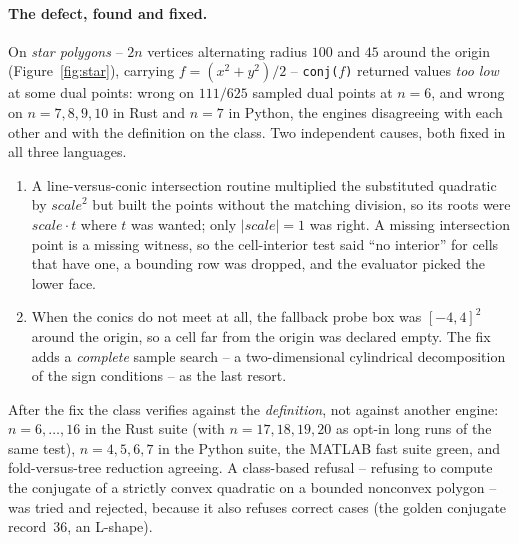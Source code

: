 \documentclass[11pt]{article}
\theoremstyle{definition}
\begin{document}
\paragraph{The defect, found and fixed.}
On \emph{star polygons} -- $2n$ vertices alternating radius $100$ and $45$
around the origin (Figure~\ref{fig:star}), carrying $f=(x^2+y^2)/2$ --
\texttt{conj($f$)} returned values \emph{too low} at some dual points: wrong on
$111/625$ sampled dual points at $n=6$, and wrong on $n=7,8,9,10$ in Rust and
$n=7$ in Python, the engines disagreeing with each other and with the
definition on the class. Two independent causes, both fixed in all three
languages.
\begin{enumerate}[label=(\arabic*),leftmargin=*]
\item A line-versus-conic intersection routine multiplied the substituted
  quadratic by $\mathit{scale}^2$ but built the points without the matching
  division, so its roots were $\mathit{scale}\cdot t$ where $t$ was wanted; only
  $|\mathit{scale}|=1$ was right. A missing intersection point is a missing
  witness, so the cell-interior test said ``no interior'' for cells that have
  one, a bounding row was dropped, and the evaluator picked the lower face.
\item When the conics do not meet at all, the fallback probe box was
  $[-4,4]^2$ around the origin, so a cell far from the origin was declared
  empty. The fix adds a \emph{complete} sample search -- a two-dimensional
  cylindrical decomposition of the sign conditions -- as the last resort.
\end{enumerate}
After the fix the class verifies against the \emph{definition}, not against
another engine: $n=6,\ldots,16$ in the Rust suite (with $n=17,18,19,20$ as
opt-in long runs of the same test), $n=4,5,6,7$ in the Python suite, the
MATLAB fast suite green, and fold-versus-tree reduction agreeing.
 A class-based refusal -- refusing to compute
the conjugate of a strictly convex quadratic on a bounded nonconvex polygon --
was tried and rejected, because it also refuses correct cases (the golden
conjugate record~36, an L-shape).
\end{document}
